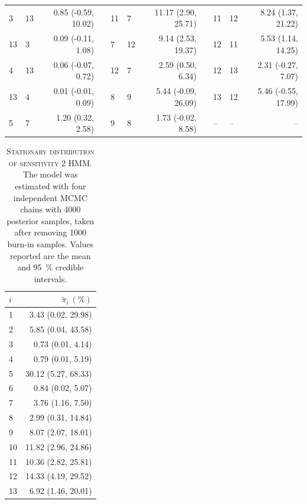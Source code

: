 \begin{table}[h!]
\begin{tabular}{llrp{0.2cm}llrp{0.2cm}llr}
 3 & 13 & 0.85 (-0.59, 10.02) & & 11 & 7 & 11.17 (2.90, 25.71) & & 11 & 12 & 8.24 (1.37, 21.22) \\
 13 & 3 & 0.09 (-0.11, 1.08) & & 7 & 12 & 9.14 (2.53, 19.37) & & 12 & 11 & 5.53 (1.14, 14.25) \\
 4 & 13 & 0.06 (-0.07, 0.72) & & 12 & 7 & 2.59 (0.50, 6.34) & & 12 & 13 & 2.31 (-0.27, 7.07) \\
 13 & 4 & 0.01 (-0.01, 0.09) & & 8 & 9 & 5.44 (-0.09, 26.09) & & 13 & 12 & 5.46 (-0.55, 17.99) \\
 5 & 7 & 1.20 (0.32, 2.58) & & 9 & 8 & 1.73 (-0.02, 8.58) & & -- & -- &   -- \\
 \hline
 \end{tabular}
\end{table}

\begin{table}[h!]
 \centering
 \caption[Stationary distribution of sensitivity 2 HMM]{\textsc{Stationary distribution of sensitivity 2 HMM}. The model was estimated with four independent MCMC chains with \num{4000} posterior samples, taken after removing \num{1000} burn-in samples. Values reported are the mean and \SI{95}{\percent} credible intervals.}
 \label{tab:sens_2_stat_dist}
 \begin{tabular}{lr}
 \toprule
 $i$ & $\widetilde{\pi}_{i}\ (\si{\percent})$ \\
 \midrule
 1 & 3.43 (0.02, 29.98) \\
 2 & 5.85 (0.04, 43.58) \\
 3 & 0.73 (0.01, 4.14) \\
 4 & 0.79 (0.01, 5.19) \\
 5 & 30.12 (5.27, 68.33) \\
 6 & 0.84 (0.02, 5.07) \\
 7 & 3.76 (1.16, 7.50) \\
 8 & 2.99 (0.31, 14.84) \\
 9 & 8.07 (2.07, 18.01) \\
 10 & 11.82 (2.96, 24.86) \\
 11 & 10.36 (2.82, 25.81) \\
 12 & 14.33 (4.19, 29.52) \\
 13 & 6.92 (1.46, 20.01) \\
 \bottomrule
 \end{tabular}
\end{table}

